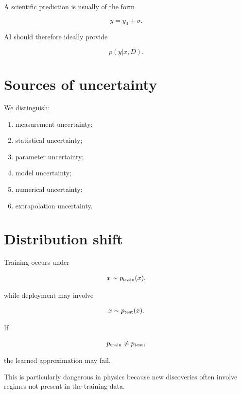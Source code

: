 \documentclass[11pt,a4paper,oneside]{book}
\begin{document}
A scientific prediction is usually of the form

\begin{equation}
y=y_0\pm\sigma.
\end{equation}

AI should therefore ideally provide

\begin{equation}
p(y|x,D).
\end{equation}

\section{Sources of uncertainty}

We distinguish:

\begin{enumerate}
\item measurement uncertainty;
\item statistical uncertainty;
\item parameter uncertainty;
\item model uncertainty;
\item numerical uncertainty;
\item extrapolation uncertainty.
\end{enumerate}

\section{Distribution shift}

Training occurs under

\begin{equation}
x\sim p_{\rm train}(x),
\end{equation}

while deployment may involve

\begin{equation}
x\sim p_{\rm test}(x).
\end{equation}

If

\begin{equation}
p_{\rm train}\neq p_{\rm test},
\end{equation}

the learned approximation may fail.

This is particularly dangerous in physics because new discoveries often
involve regimes not present in the training data.

\end{document}
